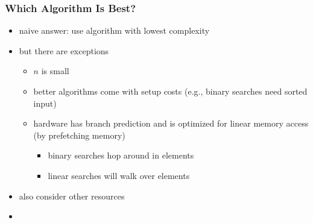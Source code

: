\begin{frame}
 \frametitle{Which Algorithm Is Best?}
 \begin{itemize}
  \item naive answer: use algorithm with lowest complexity
  \item but there are exceptions
  \begin{itemize}
   \item \(n\) is small
   \item better algorithms come with setup costs (e.g., binary searches need sorted input)
   \item hardware has branch prediction and is optimized for linear memory access (by prefetching memory)
   \begin{itemize}
    \item binary searches hop around in elements
    \item linear searches will walk over elements
   \end{itemize}
  \end{itemize}
  \item also consider other resources
 \end{itemize}
 \begin{itemize}
  \item {}
 \end{itemize}
\end{frame}
